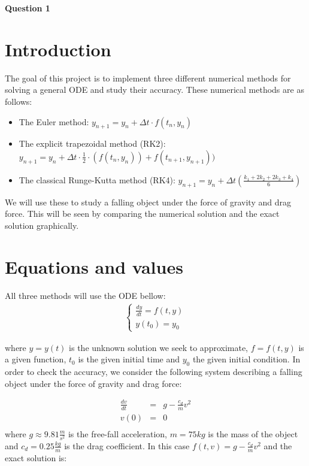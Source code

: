 \documentclass[12pt]{article}
\begin{document}
\centerline{\Large\textbf{Question 1}}
\vspace{2cm}

\section{Introduction}\label{sec::Intro}
The goal of this project is to implement three different numerical methods for solving a general ODE and study their accuracy.  These numerical methods are as follows:
\begin{itemize}
\item The Euler method: $y_{n+1}= y_n + \Delta t \cdot f(t_n,y_n)$
\item The explicit trapezoidal method (RK2): $y_{n+1}=y_n+\Delta t \cdot \frac{1}{2}\cdot (f(t_n,y_n))+f(t_{n+1},y_{n+1}))$
\item The classical Runge-Kutta method (RK4): $y_{n+1}= y_n+\Delta t (\frac{k_1+2k_2+2k_3+k_4}{6})$
\end{itemize}
We will use these to study a falling object under the force of gravity and drag force.  This will be seen by comparing the numerical solution and the exact solution graphically.  

\section{Equations and values}\label{sec::equations and values}
All three methods will use the ODE bellow:
 \begin{eqnarray}
\left\{\begin{matrix}
\frac{dy}{dt} = f(t, y)\\
y(t_0) = y_0
\end{matrix}\right.
       \end{eqnarray}

where $y = y(t)$ is the unknown solution we seek to approximate, $f = f(t, y)$ is a given function,
$t_0$ is the given initial time and $y_0$ the given initial condition.  In order to check the accuracy, we consider the following system describing a falling object under the force of gravity and drag force:

 \begin{eqnarray}
\frac{dv}{dt}  &=& g -\frac{c_d}{m}v^2 \\\nonumber
v(0) &=& 0  \\\nonumber
       \end{eqnarray}
where $g \approx 9.81\frac{m}{s^2}$ is the free-fall acceleration, $m = 75 kg$ is the mass of the object and
$c_d = 0.25 \frac{kg}{m}$ is the drag coefficient. In this case $f(t, v) = g −\frac{c_d}{m}v^2$ and the exact solution is:
\end{document}
